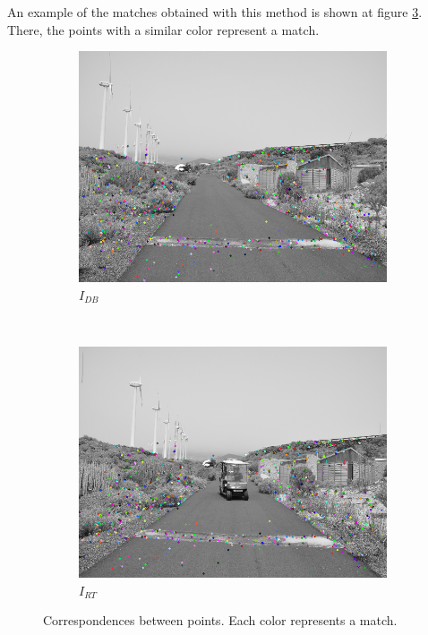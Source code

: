 An example of the matches obtained with this method is shown at figure \ref{fig:cp01_matches}. There, the points with a similar color represent a match.

\begin{figure}[h!]
        \centering
        \begin{subfigure}[b]{0.45\textwidth}
                \centering
                \includegraphics[width=\textwidth]{matches1}
                \caption{$I_{DB}$}\label{fig:cp01_matches_1}
        \end{subfigure}%
        ~ %
        \begin{subfigure}[b]{0.45\textwidth}
                \centering
                \includegraphics[width=\textwidth]{matches2}
                \caption{$I_{RT}$}\label{fig:cp01_matches_2}
        \end{subfigure}%
        \caption{Correspondences between points. Each color represents a match.}\label{fig:cp01_matches}
\end{figure}


